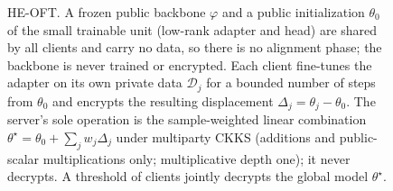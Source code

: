 \begin{figure}[t]
{%
}
\caption{HE-OFT. A frozen public backbone $\varphi$ and a public initialization $\theta_0$ of the small
trainable unit (low-rank adapter and head) are shared by all clients and carry no data, so there is no
alignment phase; the backbone is never trained or encrypted. Each client fine-tunes the adapter on its own
private data $\mathcal{D}_j$ for a bounded number of steps from $\theta_0$ and encrypts the resulting
displacement $\Delta_j=\theta_j-\theta_0$. The server's sole operation is the sample-weighted linear combination
$\theta^\star=\theta_0+\sum_j w_j\Delta_j$ under multiparty CKKS (additions and public-scalar
multiplications only; multiplicative depth one); it never decrypts. A threshold of clients jointly decrypts
the global model $\theta^\star$.}
\label{fig:protocol}
\end{figure}
